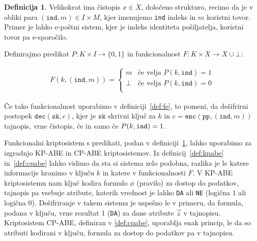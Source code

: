 \documentclass[12pt,a4paper,openany,tikz]{book}
\theoremstyle{plain}
\theoremstyle{definition}
\newtheorem{defn}[thm]{Definicija} %
\begin{document}
\begin{mdframed}[frametitle={Funkcionalni kriptosistem s predikati}]
\begin{defn}
Velikokrat ima čistopis $x \in X$, določeno strukturo, recimo da je v obliki para $(\texttt{ind}, m) \in I \times M$, kjer imenujemo \texttt{ind} indeks in $m$ koristni tovor. Primer je lahko e-poštni sistem, kjer je indeks identiteta pošiljatelja, koristni tovor pa e-sporočilo.

Definirajmo predikat $P: K \times I \rightarrow {\{}0, 1{\}}$ in funkcionalnost $F: K \times X \rightarrow X \cup \bot$:

\begin{gather*}
F(k, (\texttt{ind}, m)) = \begin{cases}
m & \text{če velja } P(k, \texttt{ind}) = 1\\
\bot & \text{če velja } P(k, \texttt{ind}) = 0\\
\end{cases}
\end{gather*}

\noindent
Če tako funkcionalnost uporabimo v definiciji~\ref{def:fe}, to pomeni, da dešifrirni postopek $\texttt{dec}(\texttt{sk}, c)$, kjer je $\texttt{sk}$ skrivni ključ za $k$ in $c = \texttt{enc}(\texttt{pp}, (\texttt{ind}, m))$ tajnopis, vrne čistopis, če in samo če $P(k, \text{\texttt{ind}})=1$.

\label{def:fepredicate}
\end{defn}
\end{mdframed}

Funkcionalni kriptosistem s predikati, podan v definiciji~\ref{def:fepredicate}, lahko uporabimo za izgradnjo KP-ABE in CP-ABE kriptosistemov. Iz definicij~\ref{def:kpabe} in~\ref{def:cpabe} lahko vidimo da sta si sistema zelo podobna, razlika je le katere informacije hranimo v ključu $k$ in katere v funkcionalnosti $F$. V KP-ABE kriptosistemu nam ključ kodira formulo $\phi$ (pravilo) za dostop do podatkov, tajnopis pa vsebuje atribute, katerih vrednost je lahko \texttt{DA} ali \texttt{NE} (logična $1$ ali logična $0$). Dešifriranje v takem sistemu je uspešno le v primeru, da formula, podana v ključu, vrne rezultat 1 (\texttt{DA}) za dane atribute $\vec{z}$ v tajnopisu. Kriptosistem CP-ABE, definiran v \ref{def:cpabe}, uporablja enak princip, le da so atributi kodirani v ključu, formula za dostop do podatkov pa v tajnopisu.
\end{document}
